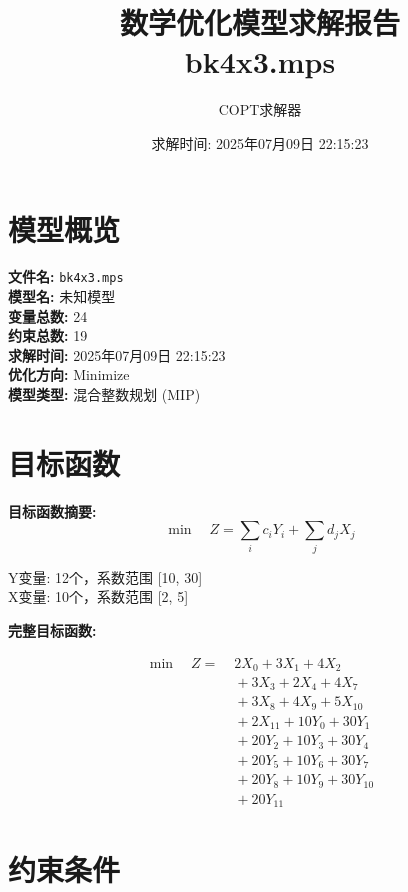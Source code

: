 \documentclass[a4paper,10pt]{article}
\title{数学优化模型求解报告\\{\large bk4x3.mps}}
\author{COPT求解器}
\date{求解时间: 2025年07月09日 22:15:23}
\begin{document}
\maketitle
\tableofcontents
\newpage

\section{模型概览}

\textbf{文件名:} \texttt{bk4x3.mps} \\
\textbf{模型名:} 未知模型 \\
\textbf{变量总数:} 24 \\
\textbf{约束总数:} 19 \\
\textbf{求解时间:} 2025年07月09日 22:15:23 \\
\textbf{优化方向:} Minimize \\

\textbf{模型类型:} 混合整数规划 (MIP)

\section{目标函数}

\textbf{目标函数摘要:}
\begin{equation}
\min \quad Z = \sum_{i} c_i Y_i + \sum_{j} d_j X_j
\end{equation}

Y变量: 12个，系数范围 [10, 30] \\
X变量: 10个，系数范围 [2, 5]

\textbf{完整目标函数:}

\allowdisplaybreaks
{\small
\begin{align}
\min \quad Z = &\; 2 X_{0} + 3 X_{1} + 4 X_{2} \\[0.3ex]
&\;  + 3 X_{3} + 2 X_{4} + 4 X_{7} \\[0.3ex]
&\;  + 3 X_{8} + 4 X_{9} + 5 X_{10} \\[0.3ex]
&\;  + 2 X_{11} + 10 Y_{0} + 30 Y_{1} \\[0.3ex]
&\;  + 20 Y_{2} + 10 Y_{3} + 30 Y_{4} \\[0.3ex]
&\;  + 20 Y_{5} + 10 Y_{6} + 30 Y_{7} \\[0.3ex]
&\;  + 20 Y_{8} + 10 Y_{9} + 30 Y_{10} \\[0.3ex]
&\;  + 20 Y_{11}\nonumber
\end{align}
}

\section{约束条件}
\end{document}
